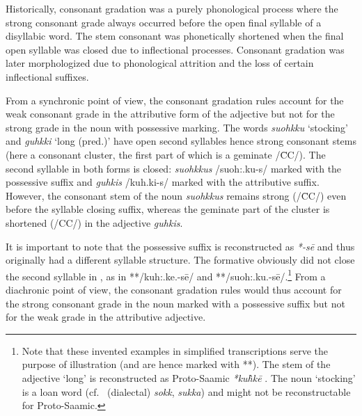 {Historically, consonant gradation was a purely phonological process where the strong consonant grade always occurred before the open final syllable of a disyllabic word. The stem consonant was phonetically shortened when the final open syllable was closed due to inflectional processes. Consonant gradation was later morphologized due to phonological attrition and the loss of certain inflectional suffixes.

From a synchronic point of view, the consonant gradation rules account for the weak consonant grade in the attributive form of the adjective but not for the strong grade in the noun with possessive marking. The  words \textit{suohkku} ‘stocking’ and \textit{guhkki} ‘long (pred.)’ have open second syllables hence strong consonant stems (here a consonant cluster, the first part of which is a geminate /\=CC/). The second syllable in both forms is closed: \textit{suohkkus} /suoh:.ku-s/ marked with the possessive suffix and \textit{guhkis} /kuh.ki-s/ marked with the attributive suffix. However, the consonant stem of the noun \textit{suohkkus} remains strong (/\=CC/) even before the syllable closing suffix, whereas the geminate part of the cluster is shortened (/CC/) in the adjective \textit{guhkis}.

It is important to note that the possessive suffix is reconstructed as  \textit{*-sē} \citep[73]{sammallahti1998b} and thus originally had a different syllable structure. The formative obviously did not close the second syllable in , as in **/kuh:.ke.-sē/ and **/suoh:.ku.-sē/.\footnote{Note that these invented examples in simplified transcriptions serve the purpose of illustration (and are hence marked with **). The stem of the adjective ‘long’ is reconstructed as Proto\hyp{}Saamic \textit{*ku\`{h}kē} \citep[246]{sammallahti1998b}. The noun ‘stocking’ is a loan word (cf.~ (dialectal) \textit{sokk},  \textit{sukka}) and might not be reconstructable for Proto\hyp{}Saamic.} From a diachronic point of view, the consonant gradation rules would thus account for the strong consonant grade in the noun marked with a possessive suffix but not for the weak grade in the attributive adjective.
 
}
